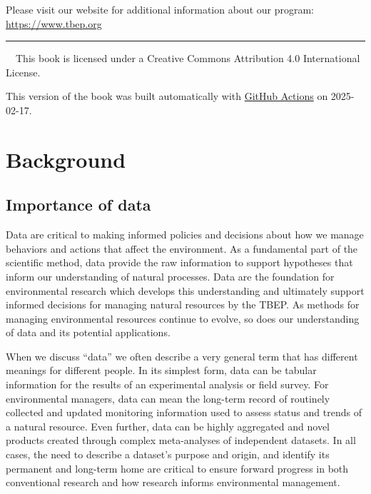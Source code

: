 \documentclass[
]{book}
\begin{document}
Please visit our website for additional information about our program: \url{https://www.tbep.org}

\begin{center}\rule{0.5\linewidth}{0.5pt}\end{center}

~~This book is licensed under a Creative Commons Attribution 4.0 International License.

This version of the book was built automatically with \href{https://github.com/tbep-tech/data-management-sop/actions}{GitHub Actions} on 2025-02-17.

\chapter{Background}\label{background}

\section{Importance of data}\label{dataimp}

Data are critical to making informed policies and decisions about how we manage behaviors and actions that affect the environment. As a fundamental part of the scientific method, data provide the raw information to support hypotheses that inform our understanding of natural processes. Data are the foundation for environmental research which develops this understanding and ultimately support informed decisions for managing natural resources by the TBEP. As methods for managing environmental resources continue to evolve, so does our understanding of data and its potential applications.

When we discuss ``data'' we often describe a very general term that has different meanings for different people. In its simplest form, data can be tabular information for the results of an experimental analysis or field survey. For environmental managers, data can mean the long-term record of routinely collected and updated monitoring information used to assess status and trends of a natural resource. Even further, data can be highly aggregated and novel products created through complex meta-analyses of independent datasets. In all cases, the need to describe a dataset's purpose and origin, and identify its permanent and long-term home are critical to ensure forward progress in both conventional research and how research informs environmental management.
\end{document}
